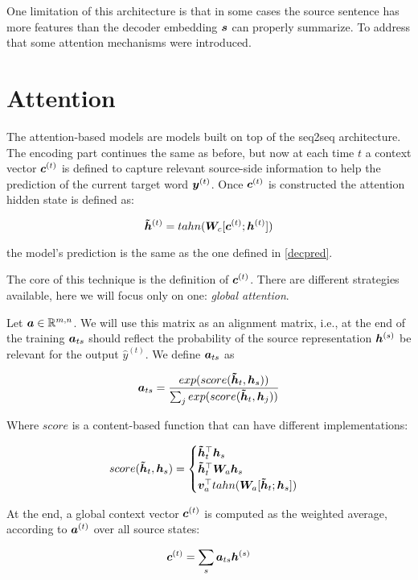One limitation of this architecture is that in some cases the source sentence has more features than the decoder embedding $\bm{s}$ can properly summarize. To address that some attention mechanisms were introduced.

\section{Attention}
\label{sec:Attention}

The attention-based models are models built on top of the seq2seq architecture. The encoding part continues the same as before, but now at each time $t$ a context vector $\bm{c}^{(t)}$ is defined to capture relevant source-side information to help the prediction of the current target word $\bm{y}^{(t)}$. Once $\bm{c}^{(t)}$ is constructed the attention hidden state is defined as:   

\begin{equation}
\bm{\tilde{h}}^{(t)} = tahn(\bm{W}_c[\bm{c}^{(t)};\bm{h}^{(t)}])
\end{equation}

the model's prediction is the same as the one defined in \ref{decpred}.

The core of this technique is the definition of $\bm{c}^{(t)}$. There are different strategies available, here we will focus only on one: \textit{global attention}.

Let $\bm{a} \in \mathbb{R}^{m,n}$. We will use this matrix as an alignment matrix, i.e., at the end of the training $\bm{a}_{ts}$ should reflect the probability of the source representation $\bm{h}^{(s)}$ be relevant for the output $\hat{y}^{(t)}$. We define $\bm{a}_{ts}$ as


\begin{equation}
\bm{a}_{ts} = \frac{exp(score(\bm{\tilde{h}}_t,\bm{h}_s))}{\sum_j exp(score(\bm{\tilde{h}}_t,\bm{h}_j))}
\end{equation}

Where $score$ is a content-based function that can have different implementations: 

\begin{equation}
score(\bm{\tilde{h}}_t,\bm{h}_s) = \begin{cases}
\bm{\tilde{h}}_t ^{\top}\bm{h}_s\\
\bm{\tilde{h}}_t ^{\top}\bm{W}_a \bm{h}_s\\
\bm{v}_a ^{\top}tahn(\bm{W}_a[\bm{\tilde{h}}_t;\bm{h}_s])\\
\end{cases}
\end{equation}

At the end, a global context vector $\bm{c}^{(t)}$ is computed as the weighted average, according to $\bm{a}^{(t)}$ over all source states:

\begin{equation}
\bm{c}^{(t)} = \sum_{s} \bm{a}_{ts}\bm{h}^{(s)}
\end{equation}

